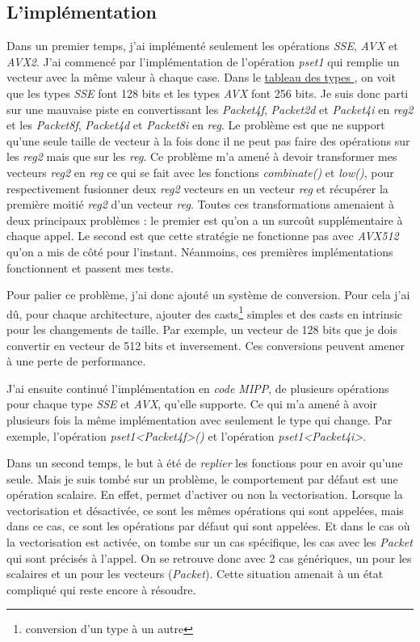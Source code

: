 \subsection{L'implémentation}

Dans un premier temps, j'ai implémenté seulement les opérations \emph{SSE}, \emph{AVX} et
\emph{AVX2}.
J'ai commencé par l'implémentation de l'opération \emph{pset1} qui remplie un vecteur avec
la même valeur à chaque case. Dans le \hyperref[eigenTypesTable]{tableau des types \Eigen},
on voit que les types \emph{SSE} font 128 bits et les types \emph{AVX} font 256 bits. Je
suis donc parti sur une mauvaise piste en convertissant les \emph{Packet4f},
\emph{Packet2d} et \emph{Packet4i} en \emph{reg2} et les \emph{Packet8f}, \emph{Packet4d}
et \emph{Packet8i} en \emph{reg}. Le problème est que \MIPP ne support qu'une seule taille
de vecteur à la fois donc il ne peut pas faire des opérations sur les \emph{reg2} mais
que sur les \emph{reg}. Ce problème m'a amené à devoir transformer mes vecteurs \emph{reg2}
en \emph{reg} ce qui se fait avec les fonctions \emph{combinate()} et \emph{low()}, pour
respectivement fusionner deux \emph{reg2} vecteurs en un vecteur \emph{reg} et récupérer
la première moitié \emph{reg2} d'un vecteur \emph{reg}. Toutes ces transformations amenaient
à deux principaux problèmes :  le premier est qu'on a un surcoût supplémentaire à chaque
appel. Le second est que cette stratégie ne fonctionne pas avec \emph{AVX512} qu'on a
mis de côté pour l'instant. Néanmoins, ces premières implémentations fonctionnent et passent
mes tests.

Pour palier ce problème, j'ai donc ajouté un système de conversion. Pour cela j'ai dû, pour
chaque architecture, ajouter des casts\footnote{conversion d'un type à un autre} simples et
des casts en intrinsic pour les changements de taille. Par exemple, un vecteur de 128 bits
que je dois convertir en vecteur de 512 bits et inversement.
Ces conversions peuvent amener à une perte de performance.


J'ai ensuite continué l'implémentation en \emph{code MIPP}, de plusieurs opérations pour
chaque type \emph{SSE} et \emph{AVX}, qu'elle supporte. Ce qui m'a amené à avoir plusieurs
fois la même implémentation \MIPP avec seulement le type qui change. Par exemple,
l'opération \emph{pset1<Packet4f>()} et l'opération \emph{pset1<Packet4i>}.

Dans un second temps, le but à été de \textit{replier} les fonctions pour en avoir qu'une
seule. Mais je suis tombé sur un problème, le comportement par défaut est une opération
scalaire. En effet, \Eigen permet d'activer ou non la vectorisation. Lorsque la
vectorisation et désactivée, ce sont les mêmes opérations qui sont appelées, mais dans ce cas,
ce sont les opérations par défaut qui sont appelées. Et dans le cas où la vectorisation est
activée, on tombe sur un cas spécifique, les cas avec les \emph{Packet} qui sont précisés
à l'appel. On se retrouve donc avec 2 cas génériques, un pour les scalaires
et un pour les vecteurs (\emph{Packet}). Cette situation amenait à un état compliqué qui
reste encore à résoudre.

